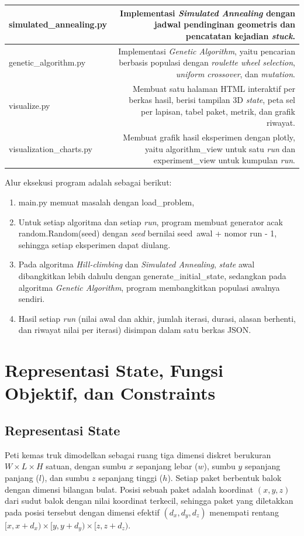 \begin{longtable}{|K|D|}
simulated\_annealing.py & Implementasi \textit{Simulated Annealing} dengan jadwal pendinginan geometris dan pencatatan kejadian \textit{stuck}. \\ \hline
genetic\_algorithm.py & Implementasi \textit{Genetic Algorithm}, yaitu pencarian berbasis populasi dengan \textit{roulette wheel selection}, \textit{uniform crossover}, dan \textit{mutation}. \\ \hline
visualize.py & Membuat satu halaman HTML interaktif per berkas hasil, berisi tampilan 3D \textit{state}, peta sel per lapisan, tabel paket, metrik, dan grafik riwayat. \\ \hline
visualization\_charts.py & Membuat grafik hasil eksperimen dengan plotly, yaitu algorithm\_view untuk satu \textit{run} dan experiment\_view untuk kumpulan \textit{run}. \\ \hline
\end{longtable}

Alur eksekusi program adalah sebagai berikut: 
\begin{enumerate}
    \item main.py memuat masalah dengan load\_problem,
    \item Untuk setiap algoritma dan setiap \textit{run}, program membuat generator acak random.Random(seed) dengan \textit{seed} bernilai seed\ awal + nomor run - 1, sehingga setiap eksperimen dapat diulang. 
    \item Pada algoritma \textit{Hill-climbing} dan \textit{Simulated Annealing}, \textit{state} awal dibangkitkan lebih dahulu dengan generate\_initial\_state, sedangkan pada algoritma \textit{Genetic Algorithm}, program membangkitkan populasi awalnya sendiri. 
    \item Hasil setiap \textit{run} (nilai awal dan akhir, jumlah iterasi, durasi, alasan berhenti, dan riwayat nilai per iterasi) disimpan dalam satu berkas JSON.
\end{enumerate}

\section{Representasi State, Fungsi Objektif, dan Constraints}

\subsection{Representasi State}

Peti kemas truk dimodelkan sebagai ruang tiga dimensi diskret berukuran $W \times L \times H$ satuan, dengan sumbu $x$ sepanjang lebar ($w$), sumbu $y$ sepanjang panjang ($l$), dan sumbu $z$ sepanjang tinggi ($h$). Setiap paket berbentuk balok dengan dimensi bilangan bulat. Posisi sebuah paket adalah koordinat $(x, y, z)$ dari sudut balok dengan nilai koordinat terkecil, sehingga paket yang diletakkan pada posisi tersebut dengan dimensi efektif $(d_x, d_y, d_z)$ menempati rentang $[x, x+d_x) \times [y, y+d_y) \times [z, z+d_z)$.

